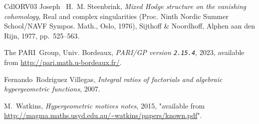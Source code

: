 \documentclass[11pt, reqno]{amsart}
\theoremstyle{plain}
\theoremstyle{definition}
\begin{document}
\begin{thebibliography}{CdlORV03}
Joseph ~H.~M. Steenbrink, \emph{Mixed {H}odge structure on the vanishing cohomology}, Real and complex singularities ({P}roc. {N}inth {N}ordic {S}ummer {S}chool/{NAVF} {S}ympos. {M}ath., {O}slo, 1976), Sijthoff \& Noordhoff, Alphen aan den Rijn, 1977, pp.~525--563. 

{The PARI~Group}, Univ. Bordeaux, \emph{{PARI/GP version \texttt{2.15.4}}}, 2023, available from \url{http://pari.math.u-bordeaux.fr/}.

Fernando~Rodriguez Villegas, \emph{Integral ratios of factorials and algebraic hypergeometric functions}, 2007.

M.~Watkins, \emph{Hypergeometric motives notes}, 2015, "available from \url{http://magma.maths.usyd.edu.au/~watkins/papers/known.pdf}".

\end{thebibliography}
\end{document}
